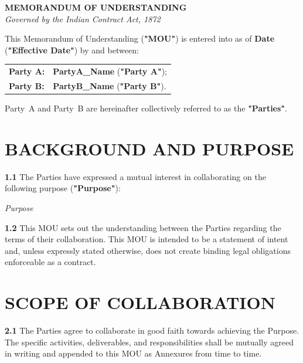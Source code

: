 \documentclass[10pt]{article}
\begin{document}
\thispagestyle{empty}

\begin{center}
  {\fontsize{15pt}{19pt}\selectfont\textbf{MEMORANDUM OF UNDERSTANDING}}\\[4pt]
  {\fontsize{9pt}{12pt}\selectfont\textit{Governed by the Indian Contract Act, 1872}}
\end{center}

\vspace{10pt}
\noindent This Memorandum of Understanding (\textbf{"MOU"}) is entered into as of \textbf{{{Date}}} (\textbf{"Effective Date"}) by and between:

\vspace{8pt}
\begin{tabularx}{\textwidth}{@{}lX@{}}
\textbf{Party A:} &
\textbf{{{PartyA_Name}}} (\textbf{"Party A"});\\[6pt]
\textbf{Party B:} &
\textbf{{{PartyB_Name}}} (\textbf{"Party B"}).\\
\end{tabularx}

\vspace{6pt}
\noindent Party~A and Party~B are hereinafter collectively referred to as the \textbf{"Parties"}.

\section{BACKGROUND AND PURPOSE}

\textbf{1.1} The Parties have expressed a mutual interest in collaborating on the following purpose (\textbf{"Purpose"}):

\vspace{4pt}
\noindent\textit{{{Purpose}}}

\vspace{6pt}
\textbf{1.2} This MOU sets out the understanding between the Parties regarding the terms of their collaboration. This MOU is intended to be a statement of intent and, unless expressly stated otherwise, does not create binding legal obligations enforceable as a contract.

\section{SCOPE OF COLLABORATION}

\textbf{2.1} The Parties agree to collaborate in good faith towards achieving the Purpose. The specific activities, deliverables, and responsibilities shall be mutually agreed in writing and appended to this MOU as Annexures from time to time.
\end{document}
